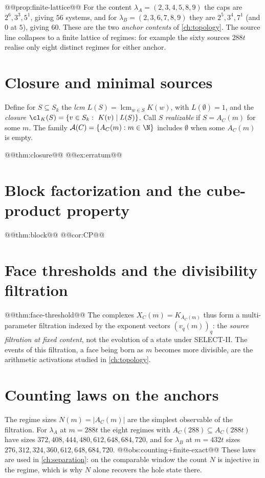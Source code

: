 @@prop:finite-lattice@@
For the content $\lambda_A=(2,3,4,5,8,9)$ the caps are $2^6,3^3,5^1$, giving $56$ systems, and for $\lambda_B=(2,3,6,7,8,9)$ they are $2^5,3^4,7^1$ (and $0$ at $5$), giving $60$. These are the two \emph{anchor contents} of \cref{ch:topology}. The source line collapses to a finite lattice of regimes: for example the sixty sources $288t$ realise only eight distinct regimes for either anchor.

\section{Closure and minimal sources}
Define for $S\subseteq S_k$ the \emph{lcm} $L(S)=\operatorname{lcm}_{w\in S}K(w)$, with $L(\emptyset)=1$, and the \emph{closure} $\cl_K(S)=\{v\in S_k:\ K(v)\mid L(S)\}$. Call $S$ \emph{realizable} if $S=A_C(m)$ for some $m$. The family $\mathcal A(C)=\{A_C(m):m\in\N\}$ includes $\emptyset$ when some $A_C(m)$ is empty.

@@thm:closure@@
@@ex:erratum@@

\section{Block factorization and the cube-product property}
@@thm:block@@
@@cor:CP@@

\section{Face thresholds and the divisibility filtration}
@@thm:face-threshold@@
The complexes $X_C(m)=K_{A_C(m)}$ thus form a multi-parameter filtration indexed by the exponent vectors $(v_q(m))_q$: the \emph{source filtration at fixed content}, not the evolution of a state under SELECT-II. The events of this filtration, a face being born as $m$ becomes more divisible, are the arithmetic activations studied in \cref{ch:topology}.

\section{Counting laws on the anchors}
The regime sizes $N(m)=|A_C(m)|$ are the simplest observable of the filtration. For $\lambda_A$ at $m=288t$ the eight regimes with $A_C(288)\subseteq A_C(288t)$ have sizes $372,408,444,480,612,648,684,720$, and for $\lambda_B$ at $m=432t$ sizes $276,312,324,360,612,648,684,720$.
@@obs:counting+finite-exact@@
These laws are used in \cref{ch:separation}: on the comparable window the count $N$ is injective in the regime, which is why $N$ alone recovers the hole state there.
